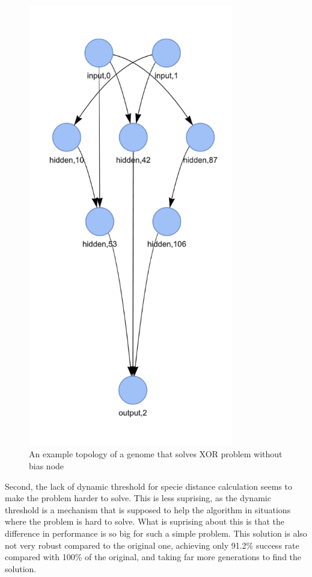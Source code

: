 \documentclass{article}
\begin{document}
    \begin{figure}
        \centering
        \includegraphics[width=0.8\textwidth]{xor_topology_example.png}
        \caption{An example topology of a genome that solves XOR problem without bias node }
        \label{fig:xor_bias}
    \end{figure}
    Second, the lack of dynamic threshold for specie distance calculation seems to make the problem harder to solve.
    This is less suprising, as the dynamic threshold is a mechanism that is supposed to help the algorithm in situations
    where the problem is hard to solve. What is suprising about this is that the difference in performance is so big for
    such a simple problem. This solution is also not very robust compared to the original one, achieving only 91.2\% success rate
    compared with 100\% of the original, and taking far more generations to find the solution.
\end{document}
